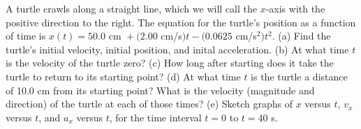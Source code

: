 \documentclass[12pt]{article}
\newenvironment{problem}[2][]{
    \begin{trivlist}
        \item[
            {\bfseries #1}
            {\bfseries #2}
        ]
}{\end{trivlist}}
\begin{document}
\begin{problem}{2.15}
    A turtle crawls along a straight line, which we will call the $x$-axis with the positive direction to the right.
    The equation for the turtle's position as a function of time is $x(t) = 50.0 \text{ cm } + (2.00 $ cm/s$)t - (0.0625$ cm/s$^2)t^2$.
    (a) Find the turtle's initial velocity, initial position, and inital acceleration.
    (b) At what time $t$ is the velocity of the turtle zero?
    (c) How long after starting does it take the turtle to return to its
    starting point?
    (d) At what time $t$ is the turtle a distance of 10.0 cm from its starting point?
    What is the velocity (magnitude and direction) of the turtle at each of those times?
    (e) Sketch graphs of $x$ versus $t$, $v_x$ versus $t$, and $a_x$ versus $t$, for the time interval $t = 0$ to $t = 40$ s.


\end{problem}
\end{document}
